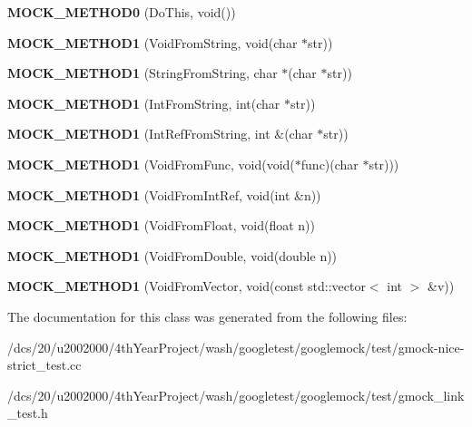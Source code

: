 \begin{DoxyCompactItemize}
\item 
\mbox{\label{classMock_ae710f23cafb1a2f17772e8805d6312d2}} 
{\bfseries M\+O\+C\+K\+\_\+\+M\+E\+T\+H\+O\+D0} (Do\+This, void())
\item 
\mbox{\label{classMock_ada59eea6991953353f332e3ea1e74444}} 
{\bfseries M\+O\+C\+K\+\_\+\+M\+E\+T\+H\+O\+D1} (Void\+From\+String, void(char $\ast$str))
\item 
\mbox{\label{classMock_a2db4d82b6f92b4e462929f651ac4c3b1}} 
{\bfseries M\+O\+C\+K\+\_\+\+M\+E\+T\+H\+O\+D1} (String\+From\+String, char $\ast$(char $\ast$str))
\item 
\mbox{\label{classMock_ae73b4ee90bf6d84205d2b1c17f0b8433}} 
{\bfseries M\+O\+C\+K\+\_\+\+M\+E\+T\+H\+O\+D1} (Int\+From\+String, int(char $\ast$str))
\item 
\mbox{\label{classMock_a2cece30a3ea92b34f612f8032fe3a0f9}} 
{\bfseries M\+O\+C\+K\+\_\+\+M\+E\+T\+H\+O\+D1} (Int\+Ref\+From\+String, int \&(char $\ast$str))
\item 
\mbox{\label{classMock_ac70c052254fa9816bd759c006062dc47}} 
{\bfseries M\+O\+C\+K\+\_\+\+M\+E\+T\+H\+O\+D1} (Void\+From\+Func, void(void($\ast$func)(char $\ast$str)))
\item 
\mbox{\label{classMock_ae2379efbc030f1adf8b032be3bdf081d}} 
{\bfseries M\+O\+C\+K\+\_\+\+M\+E\+T\+H\+O\+D1} (Void\+From\+Int\+Ref, void(int \&n))
\item 
\mbox{\label{classMock_a3fd62026610c5d3d3aeaaf2ade3e18aa}} 
{\bfseries M\+O\+C\+K\+\_\+\+M\+E\+T\+H\+O\+D1} (Void\+From\+Float, void(float n))
\item 
\mbox{\label{classMock_a890668928abcd28d4d39df164e7b6dd8}} 
{\bfseries M\+O\+C\+K\+\_\+\+M\+E\+T\+H\+O\+D1} (Void\+From\+Double, void(double n))
\item 
\mbox{\label{classMock_a50e2bda4375a59bb89fd5652bd33eb0f}} 
{\bfseries M\+O\+C\+K\+\_\+\+M\+E\+T\+H\+O\+D1} (Void\+From\+Vector, void(const std\+::vector$<$ int $>$ \&v))
\end{DoxyCompactItemize}


The documentation for this class was generated from the following files\+:\begin{DoxyCompactItemize}
\item 
/dcs/20/u2002000/4th\+Year\+Project/wash/googletest/googlemock/test/gmock-\/nice-\/strict\+\_\+test.\+cc\item 
/dcs/20/u2002000/4th\+Year\+Project/wash/googletest/googlemock/test/gmock\+\_\+link\+\_\+test.\+h\end{DoxyCompactItemize}
